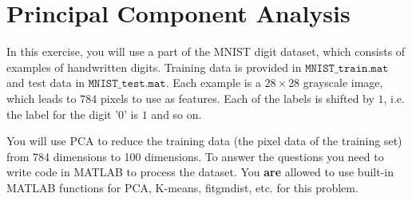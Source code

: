 \section{Principal Component Analysis }

In this exercise, you will use a part of the MNIST digit dataset, which consists of examples of handwritten digits. Training data is provided in \(\mathtt{MNIST\_train.mat}\) and test data in \(\mathtt{MNIST\_test.mat}\). Each example is a $28 \times 28$ grayscale image, which leads to $784$ pixels to use as features. Each of the labels is shifted by $1$, i.e. the label for the digit '$0$' is $1$ and so on.

You will use PCA to reduce the training data (the pixel data of the training set) from 784 dimensions to 100 dimensions. To 
answer the questions you need to write code in MATLAB to process
the dataset. You {\bf are} allowed to use built-in MATLAB functions for PCA, K-means, fitgmdist, etc. for this problem.

